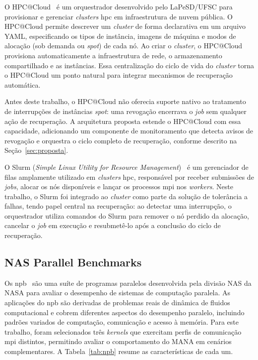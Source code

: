 \documentclass[a4paper,11pt]{article}
\begin{document}
            O HPC@Cloud~\cite{munhoz2024hpccloud} é um orquestrador desenvolvido pelo
            LaPeSD/UFSC para provisionar e gerenciar \textit{clusters} \gls{hpc} em
            infraestrutura de nuvem pública. O HPC@Cloud permite descrever um
            \textit{cluster} de forma declarativa em um arquivo YAML, especificando os
            tipos de instância, imagens de máquina e modos de alocação (sob demanda ou
            \textit{spot}) de cada nó. Ao criar o \textit{cluster}, o HPC@Cloud
            provisiona automaticamente a infraestrutura de rede, o armazenamento
            compartilhado e as instâncias. Essa centralização do ciclo de vida do
            \textit{cluster} torna o HPC@Cloud um ponto natural para integrar
            mecanismos de recuperação automática.

            Antes deste trabalho, o HPC@Cloud não oferecia suporte nativo ao tratamento
            de interrupções de instâncias \textit{spot}: uma revogação encerrava o
            \textit{job} sem qualquer ação de recuperação. A arquitetura proposta
            estende o HPC@Cloud com essa capacidade, adicionando um componente de
            monitoramento que detecta avisos de revogação e orquestra o ciclo completo
            de recuperação, conforme descrito na Seção~\ref{sec:proposta}.

            O Slurm (\textit{Simple Linux Utility for Resource Management})~\cite{jette2003slurm}
            é um gerenciador de filas amplamente utilizado em \textit{clusters} \gls{hpc},
            responsável por receber submissões de \textit{jobs}, alocar os nós
            disponíveis e lançar os processos \gls{mpi} nos \textit{workers}. Neste trabalho,
            o Slurm foi integrado ao \textit{cluster} como parte da solução de
            tolerância a falhas, tendo papel central na recuperação: ao detectar uma
            interrupção, o orquestrador utiliza comandos do Slurm para remover o nó
            perdido da alocação, cancelar o \textit{job} em execução e resubmetê-lo
            após a conclusão do ciclo de recuperação.

        \subsection{NAS Parallel Benchmarks}
        \label{sec:npb}

            Os \gls{npb}~\cite{bailey1991nas} são uma suíte de
            programas paralelos desenvolvida pela divisão NAS da NASA para avaliar o
            desempenho de sistemas de computação paralela. As aplicações do \gls{npb} são
            derivadas de problemas reais de dinâmica de fluidos computacional e cobrem
            diferentes aspectos do desempenho paralelo, incluindo padrões variados de
            computação, comunicação e acesso à memória. Para este trabalho, foram
            selecionados três \textit{kernels} que exercitam perfis de comunicação \gls{mpi}
            distintos, permitindo avaliar o comportamento do MANA em cenários
            complementares. A Tabela~\ref{tab:npb} resume as características de cada
            um.
\end{document}
